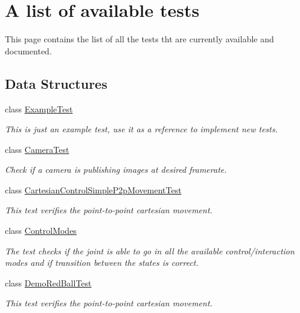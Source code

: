 \section{A list of available tests}
\label{group__icub-tests}


This page contains the list of all the tests tht are currently available and documented.  


\subsection*{Data Structures}
\begin{DoxyCompactItemize}
\item 
class \hyperlink{classExampleTest}{Example\+Test}
\begin{DoxyCompactList}\small\item\em This is just an example test, use it as a reference to implement new tests. \end{DoxyCompactList}\item 
class \hyperlink{classCameraTest}{Camera\+Test}
\begin{DoxyCompactList}\small\item\em Check if a camera is publishing images at desired framerate. \end{DoxyCompactList}\item 
class \hyperlink{classCartesianControlSimpleP2pMovementTest}{Cartesian\+Control\+Simple\+P2p\+Movement\+Test}
\begin{DoxyCompactList}\small\item\em This test verifies the point-\/to-\/point cartesian movement. \end{DoxyCompactList}\item 
class \hyperlink{classControlModes}{Control\+Modes}
\begin{DoxyCompactList}\small\item\em The test checks if the joint is able to go in all the available control/interaction modes and if transition between the states is correct. \end{DoxyCompactList}\item 
class \hyperlink{classDemoRedBallTest}{Demo\+Red\+Ball\+Test}
\begin{DoxyCompactList}\small\item\em This test verifies the point-\/to-\/point cartesian movement. \end{DoxyCompactList}\item 

\end{DoxyCompactItemize}
